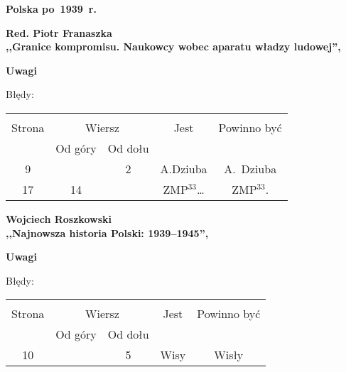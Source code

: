 \documentclass[a4paper,11pt]{article}
\newcommand{\spaceTwo}{2em}
\newcommand{\spaceThree}{1em}
\newcommand{\tb}{\textbf}
\newcommand{\Center}[1]{\begin{center} #1 \end{center}}
\newcommand{\CenterTB}[1]{\Center{\tb{#1}}}
\newcommand{\Work}[1]{ \begin{center} {\large \tb{#1}} \end{center} }
\begin{document}
\vspace{\spaceTwo}






\vspace{\spaceTwo}

\Work{Polska po~1939~r.}

\vspace{\spaceTwo} \vspace{\spaceThree}



\Work{
  Red. Piotr Franaszka \\
  ,,Granice kompromisu. Naukowcy wobec aparatu władzy ludowej'',
  \cite{RedFranaszkaGraniceKompromisu15} }


\CenterTB{Uwagi}

Błędy:\\
\begin{center}
  \begin{tabular}{|c|c|c|c|c|}
    \hline
    & \multicolumn{2}{c|}{} & & \\
    Strona & \multicolumn{2}{c|}{Wiersz}& Jest & Powinno być \\ \cline{2-3}
    & Od góry & Od dołu &  &  \\ \hline
    9 & & 2 & A.Dziuba & A.~Dziuba \\
    17 & 14 & & ZMP$^{ 33 }$\ldots & ZMP$^{ 33 }$. \\
    \hline
  \end{tabular}
\end{center}

\vspace{\spaceTwo}



\Work{
  Wojciech Roszkowski \\
  ,,Najnowsza historia Polski: 1939--1945'',
  \cite{RoszkowskiNajnowszaHistoriaPolski39-45Wyd11} }


\CenterTB{Uwagi}

Błędy:\\
\begin{center}
  \begin{tabular}{|c|c|c|c|c|}
    \hline
    & \multicolumn{2}{c|}{} & & \\
    Strona & \multicolumn{2}{c|}{Wiersz}& Jest & Powinno być \\ \cline{2-3}
    & Od góry & Od dołu &  &  \\ \hline
    10 & & 5 & Wisy & Wisły \\
    \hline
  \end{tabular}
\end{center}
\end{document}
